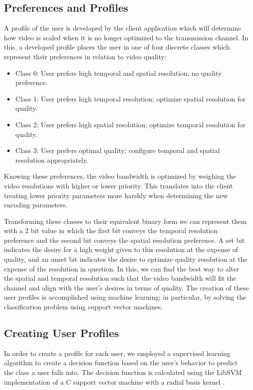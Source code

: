 \subsection{Preferences and Profiles}
A profile of the user is developed by the client application which will determine how video is scaled when it is no longer optimized to the transmission channel. In this, a developed profile places the user in one of four discrete classes which represent their preferences in relation to video quality:
\begin{itemize}
\item Class 0: User prefers high temporal and spatial resolution, no quality preference.
\item Class 1: User prefers high temporal resolution; optimize spatial resolution for quality.
\item Class 2: User prefers high spatial resolution; optimize temporal resolution for quality.
\item Class 3: User prefers optimal quality; configure temporal and spatial resolution appropriately.
\end{itemize}
Knowing these preferences, the video bandwidth is optimized by weighing the video resolutions with higher or lower priority. This translates into the client treating lower priority parameters more harshly when determining the new encoding parameters.

Transforming these classes to their equivalent binary form we can represent them with a 2 bit value in which the first bit conveys the temporal resolution preference and the second bit conveys the spatial resolution preference. A set bit indicates the desire for a high weight given to this resolution at the expense of quality, and an unset bit indicates the desire to optimize quality resolution at the expense of the resolution in question. In this, we can find the best way to alter the spatial and temporal resolution such that the video bandwidth will fit the channel and align with the user's desires in terms of quality. The creation of these user profiles is accomplished using machine learning; in particular, by solving the classification problem using support vector machines.

\subsection{Creating User Profiles}
In order to create a profile for each user, we employed a supervised learning algorithm to create a decision function based on the user’s behavior to predict the class a user falls into. The decision function is calculated using the LibSVM implementation of a C support vector machine with a radial basis kernel \cite{LibSVM}.


